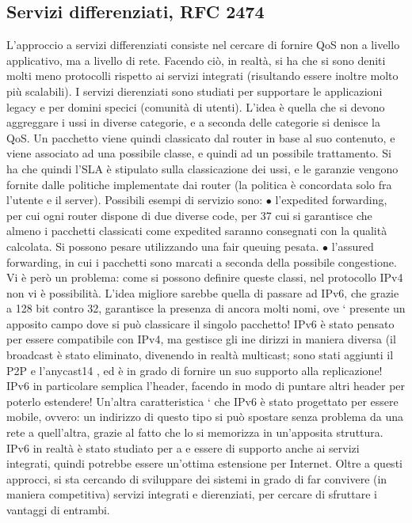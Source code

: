 \subsection{Servizi differenziati, RFC 2474}
L'approccio a servizi differenziati consiste nel cercare di fornire QoS non a livello
applicativo, ma a livello di rete. Facendo ciò, in realtà, si ha che si sono deniti
molti meno protocolli rispetto ai servizi integrati (risultando essere inoltre molto
più scalabili). I servizi dierenziati sono studiati per supportare le applicazioni
legacy e per domini specici (comunità di utenti). L'idea è quella che si devono
aggreggare i ussi in diverse categorie, e a seconda delle categorie si denisce la
QoS. Un pacchetto viene quindi classicato dal router in base al suo contenuto,
e viene associato ad una possibile classe, e quindi ad un possibile trattamento.
Si ha che quindi l'SLA è stipulato sulla classicazione dei ussi, e le garanzie
vengono fornite dalle politiche implementate dai router (la politica è concordata
solo fra l'utente e il server).
Possibili esempi di servizio sono:
$\bullet$ l'expedited forwarding, per cui ogni router dispone di due diverse code, per
37
cui si garantisce che almeno i pacchetti classicati come expedited saranno
consegnati con la qualità calcolata. Si possono pesare utilizzando una fair
queuing pesata.
$\bullet$ l'assured forwarding, in cui i pacchetti sono marcati a seconda della possibile congestione.
Vi è però un problema: come si possono definire queste classi, nel protocollo
IPv4 non vi è possibilità. L'idea migliore sarebbe quella di passare ad IPv6, che
grazie a 128 bit contro 32, garantisce la presenza di ancora molti nomi, ove `
presente un apposito campo dove si può classicare il singolo pacchetto!
IPv6 è stato pensato per essere compatibile con IPv4, ma gestisce gli ine
dirizzi in maniera diversa (il broadcast è stato eliminato, divenendo in realtà
multicast; sono stati aggiunti il P2P e l'anycast14 , ed è in grado di fornire un
suo supporto alla replicazione! IPv6 in particolare semplica l'header, facendo
in modo di puntare altri header per poterlo estendere! Un'altra caratteristica
` che IPv6 è stato progettato per essere mobile, ovvero: un indirizzo di questo
tipo si può spostare senza problema da una rete a quell'altra, grazie al fatto che
lo si memorizza in un'apposita struttura. IPv6 in realtà è stato studiato per
a e
essere di supporto anche ai servizi integrati, quindi potrebbe essere un'ottima
estensione per Internet.
Oltre a questi approcci, si sta cercando di sviluppare dei sistemi in grado
di far convivere (in maniera competitiva) servizi integrati e dierenziati, per
cercare di sfruttare i vantaggi di entrambi.
